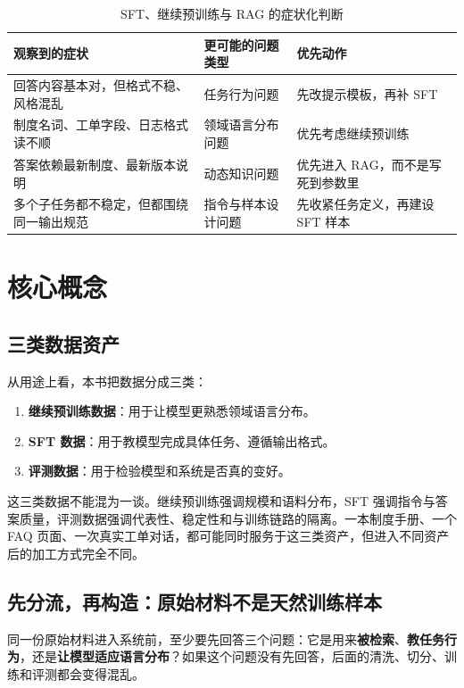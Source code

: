 \begin{table}[H]
\centering
\small
\begin{tabularx}{\textwidth}{>{\raggedright\arraybackslash}p{3cm}>{\raggedright\arraybackslash}p{4.2cm}>{\raggedright\arraybackslash}X}
\toprule
\textbf{观察到的症状} & \textbf{更可能的问题类型} & \textbf{优先动作} \\
\midrule
回答内容基本对，但格式不稳、风格混乱 & 任务行为问题 & 先改提示模板，再补 SFT \\
制度名词、工单字段、日志格式读不顺 & 领域语言分布问题 & 优先考虑继续预训练 \\
答案依赖最新制度、最新版本说明 & 动态知识问题 & 优先进入 RAG，而不是写死到参数里 \\
多个子任务都不稳定，但都围绕同一输出规范 & 指令与样本设计问题 & 先收紧任务定义，再建设 SFT 样本 \\
\bottomrule
\end{tabularx}
\caption{SFT、继续预训练与 RAG 的症状化判断}
\label{tab:data-routing-diagnosis}
\end{table}

\section{核心概念}
\subsection{三类数据资产}
从用途上看，本书把数据分成三类：
\begin{enumerate}
  \item \textbf{继续预训练数据}：用于让模型更熟悉领域语言分布。
  \item \textbf{SFT 数据}：用于教模型完成具体任务、遵循输出格式。
  \item \textbf{评测数据}：用于检验模型和系统是否真的变好。
\end{enumerate}

这三类数据不能混为一谈。继续预训练强调规模和语料分布，SFT 强调指令与答案质量，评测数据强调代表性、稳定性和与训练链路的隔离。一本制度手册、一个 FAQ 页面、一次真实工单对话，都可能同时服务于这三类资产，但进入不同资产后的加工方式完全不同。

\subsection{先分流，再构造：原始材料不是天然训练样本}
同一份原始材料进入系统前，至少要先回答三个问题：它是用来\textbf{被检索}、\textbf{教任务行为}，还是\textbf{让模型适应语言分布}？如果这个问题没有先回答，后面的清洗、切分、训练和评测都会变得混乱。


